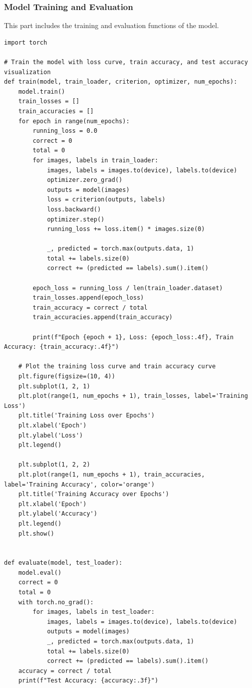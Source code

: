 \documentclass[a4paper,12pt]{article}
\begin{document}
\subsubsection{Model Training and Evaluation}
This part includes the training and evaluation functions of the model.
\begin{lstlisting}
import torch

# Train the model with loss curve, train accuracy, and test accuracy visualization
def train(model, train_loader, criterion, optimizer, num_epochs):
    model.train()
    train_losses = []
    train_accuracies = []
    for epoch in range(num_epochs):
        running_loss = 0.0
        correct = 0
        total = 0
        for images, labels in train_loader:
            images, labels = images.to(device), labels.to(device)
            optimizer.zero_grad()
            outputs = model(images)
            loss = criterion(outputs, labels)
            loss.backward()
            optimizer.step()
            running_loss += loss.item() * images.size(0)
            
            _, predicted = torch.max(outputs.data, 1)
            total += labels.size(0)
            correct += (predicted == labels).sum().item()

        epoch_loss = running_loss / len(train_loader.dataset)
        train_losses.append(epoch_loss)
        train_accuracy = correct / total
        train_accuracies.append(train_accuracy)
        
        print(f"Epoch {epoch + 1}, Loss: {epoch_loss:.4f}, Train Accuracy: {train_accuracy:.4f}")

    # Plot the training loss curve and train accuracy curve
    plt.figure(figsize=(10, 4))
    plt.subplot(1, 2, 1)
    plt.plot(range(1, num_epochs + 1), train_losses, label='Training Loss')
    plt.title('Training Loss over Epochs')
    plt.xlabel('Epoch')
    plt.ylabel('Loss')
    plt.legend()

    plt.subplot(1, 2, 2)
    plt.plot(range(1, num_epochs + 1), train_accuracies, label='Training Accuracy', color='orange')
    plt.title('Training Accuracy over Epochs')
    plt.xlabel('Epoch')
    plt.ylabel('Accuracy')
    plt.legend()
    plt.show()


def evaluate(model, test_loader):
    model.eval()
    correct = 0
    total = 0
    with torch.no_grad():
        for images, labels in test_loader:
            images, labels = images.to(device), labels.to(device)
            outputs = model(images)
            _, predicted = torch.max(outputs.data, 1)
            total += labels.size(0)
            correct += (predicted == labels).sum().item()
    accuracy = correct / total
    print(f"Test Accuracy: {accuracy:.3f}")
\end{lstlisting}
\end{document}
